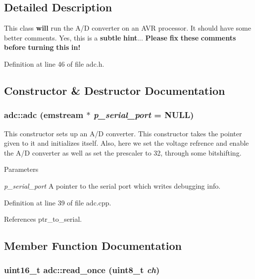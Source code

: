 \subsection{Detailed Description}
This class {\bfseries will} run the A/D converter on an AVR processor. It should have some better comments. Yes, this is a {\bfseries subtle} {\bfseries hint}... {\bfseries Please} {\bfseries fix} {\bfseries these} {\bfseries comments} {\bfseries before} {\bfseries turning} {\bfseries this} {\bfseries in!} 

Definition at line 46 of file adc.h.

\subsection{Constructor \& Destructor Documentation}
\hypertarget{classadc_af3b8262c08f5fc5ae325a20622883424}{
\subsubsection[{adc}]{\setlength{\rightskip}{0pt plus 5cm}adc::adc (emstream $\ast$ {\em p\_\-serial\_\-port} = {\ttfamily NULL})}}
\label{classadc_af3b8262c08f5fc5ae325a20622883424}


This constructor sets up an A/D converter. This constructor takes the pointer given to it and initializes itself. Also, here we set the voltage refrence and enable the A/D converter as well as set the prescaler to 32, through some bitshifting. 
\begin{DoxyParams}{Parameters}
\item[{\em p\_\-serial\_\-port}]A pointer to the serial port which writes debugging info. \end{DoxyParams}


Definition at line 39 of file adc.cpp.

References ptr\_\-to\_\-serial.

\subsection{Member Function Documentation}
\hypertarget{classadc_a2190a59696a7093e1ea605e998ccf97e}{
\subsubsection[{read\_\-once}]{\setlength{\rightskip}{0pt plus 5cm}uint16\_\-t adc::read\_\-once (uint8\_\-t {\em ch})}}
\label{classadc_a2190a59696a7093e1ea605e998ccf97e}


